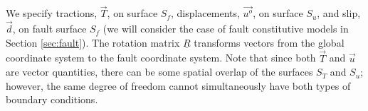 We specify tractions, $\vec{T}$, on surface $S_{f}$, displacements,
$\overrightarrow{u^{o}}$, on surface $S_{u}$, and slip, $\vec{d}$,
on fault surface $S_{f}$ (we will consider the case of fault constitutive
models in Section \vref{sec:fault}). The rotation matrix $\underline{R}$
transforms vectors from the global coordinate system to the fault
coordinate system. Note that since both $\overrightarrow{T}$ and
$\overrightarrow{u}$ are vector quantities, there can be some spatial
overlap of the surfaces $S_{T}$ and $S_{u}$; however, the same degree
of freedom cannot simultaneously have both types of boundary conditions.
